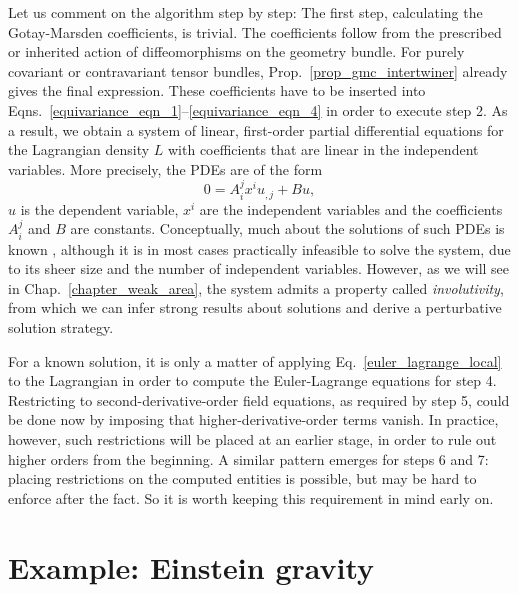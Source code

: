 Let us comment on the algorithm step by step: The first step, calculating the Gotay-Marsden coefficients, is trivial. The coefficients follow from the prescribed or inherited action of diffeomorphisms on the geometry bundle. For purely covariant or contravariant tensor bundles, Prop.\ \ref{prop_gmc_intertwiner} already gives the final expression. These coefficients have to be inserted into Eqns.\ \eqref{equivariance_eqn_1}--\eqref{equivariance_eqn_4} in order to execute step 2. As a result, we obtain a system of linear, first-order partial differential equations for the Lagrangian density $L$ with coefficients that are linear in the independent variables. More precisely, the PDEs are of the form
\begin{equation}
  0 = A^j_i x^i u_{,j} + B u,
\end{equation}
$u$ is the dependent variable, $x^i$ are the independent variables and the coefficients $A^j_i$ and $B$ are constants. Conceptually, much about the solutions of such PDEs is known \cite{Seiler_2010}, although it is in most cases practically infeasible to solve the system, due to its sheer size and the number of independent variables. However, as we will see in Chap.\ \ref{chapter_weak_area}, the system admits a property called \emph{involutivity}, from which we can infer strong results about solutions and derive a perturbative solution strategy.

For a known solution, it is only a matter of applying Eq.\ \ref{euler_lagrange_local} to the Lagrangian in order to compute the Euler-Lagrange equations for step 4. Restricting to second-derivative-order field equations, as required by step 5, could be done now by imposing that higher-derivative-order terms vanish. In practice, however, such restrictions will be placed at an earlier stage, in order to rule out higher orders from the beginning. A similar pattern emerges for steps 6 and 7: placing restrictions on the computed entities is possible, but may be hard to enforce after the fact. So it is worth keeping this requirement in mind early on.

\section{Example: Einstein gravity}

